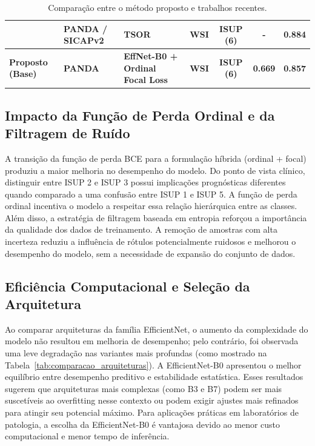 \begin{table}[htb]
{\begin{tabular}{llllccc}
			\cite{bhattacharyya2026tsor}
			& PANDA / SICAPv2
			& TSOR
			& WSI
			& ISUP (6)
			& -
			& 0.884 \\ 
			
			\midrule
			
			\textbf{Proposto (Base)} 
			& \textbf{PANDA} 
			& \textbf{EffNet-B0 + Ordinal Focal Loss} 
			& \textbf{WSI}
			& \textbf{ISUP (6)} 
			& \textbf{0.669} 
			& \textbf{0.857} \\		
			
			\bottomrule
		\end{tabular}
	}
	
	\caption{Comparação entre o método proposto e trabalhos recentes.}
	\label{tab:comparacao_estado_arte}
\end{table}

\subsection{Impacto da Função de Perda Ordinal e da Filtragem de Ruído}

A transição da função de perda BCE para a formulação híbrida (ordinal + focal) produziu a maior melhoria no desempenho do modelo. Do ponto de vista clínico, distinguir entre ISUP 2 e ISUP 3 possui implicações prognósticas diferentes quando comparado a uma confusão entre ISUP 1 e ISUP 5. A função de perda ordinal incentiva o modelo a respeitar essa relação hierárquica entre as classes. Além disso, a estratégia de filtragem baseada em entropia reforçou a importância da qualidade dos dados de treinamento. A remoção de amostras com alta incerteza reduziu a influência de rótulos potencialmente ruidosos e melhorou o desempenho do modelo, sem a necessidade de expansão do conjunto de dados.

\subsection{Eficiência Computacional e Seleção da Arquitetura}

Ao comparar arquiteturas da família EfficientNet, o aumento da complexidade do modelo não resultou em melhoria de desempenho; pelo contrário, foi observada uma leve degradação nas variantes mais profundas (como mostrado na Tabela~\ref{tab:comparacao_arquiteturas}). A EfficientNet-B0 apresentou o melhor equilíbrio entre desempenho preditivo e estabilidade estatística. Esses resultados sugerem que arquiteturas mais complexas (como B3 e B7) podem ser mais suscetíveis ao overfitting nesse contexto ou podem exigir ajustes mais refinados para atingir seu potencial máximo. Para aplicações práticas em laboratórios de patologia, a escolha da EfficientNet-B0 é vantajosa devido ao menor custo computacional e menor tempo de inferência.

